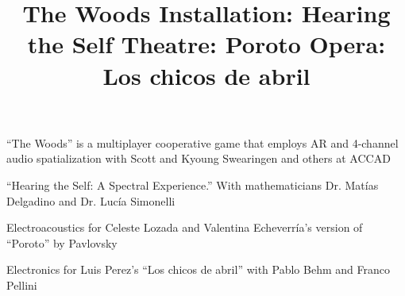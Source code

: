  \title{ The Woods }
 \begin{position}
``The Woods'' is a multiplayer cooperative game that employs AR and 4-channel audio spatialization with Scott and Kyoung Swearingen and others at ACCAD
 \end{position}

  \title{ Installation: Hearing the Self}
 \begin{position}
``Hearing the Self: A Spectral Experience.'' With mathematicians Dr. Matías Delgadino and Dr. Lucía Simonelli
 \end{position}

 
 \title{ Theatre: Poroto}
 \begin{position}
Electroacoustics for Celeste Lozada and Valentina Echeverría's version of ``Poroto'' by Pavlovsky
 \end{position}

 
 \title{ Opera: Los chicos de abril}
 \begin{position}
Electronics for Luis Perez's ``Los chicos de abril'' with Pablo Behm and Franco Pellini
 \end{position}

 
 

 

 
 
